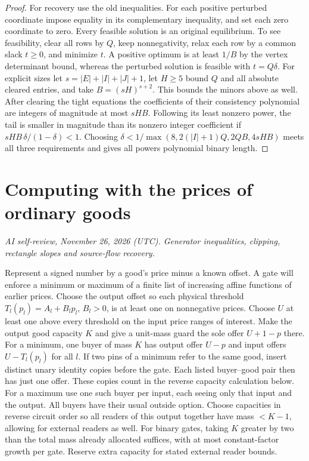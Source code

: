 \documentclass[11pt,oneside,openany,notitlepage]{report}
\newcommand{\reviewdate}{November 26, 2026 (UTC)}
\newcommand{\reviewmark}[1]{\par\nopagebreak[4]\noindent
  {\footnotesize\itshape AI self-review, \reviewdate. #1\par}\nobreak\smallskip}
\begin{document}
\begin{proof}
For recovery use the old inequalities. For each positive perturbed
coordinate impose equality in its complementary inequality, and set
each zero coordinate to zero. Every feasible solution is an original
equilibrium. To see feasibility, clear all rows by \(Q\), keep
nonnegativity, relax each row by a common slack \(t\ge0\), and minimize
\(t\). A positive optimum is at least \(1/B\) by the vertex determinant
bound, whereas the perturbed solution is feasible with \(t=Q\delta\).
For explicit sizes let \(s=|E|+|I|+|J|+1\), let \(H\ge5\) bound \(Q\)
and all absolute cleared entries, and take \(B=(sH)^{s+2}\). This bounds
the minors above as well. After clearing the tight equations the coefficients
of their consistency polynomial are integers of magnitude at most \(sHB\).
Following its least nonzero power, the tail is smaller in magnitude than
its nonzero integer coefficient if \(sHB\,\delta/(1-\delta)<1\).
Choosing \(\delta<1/\max(8,2(|I|+1)Q,2QB,4sHB)\) meets all three
requirements and gives all powers polynomial binary length.
\end{proof}

\section{Computing with the prices of ordinary goods}
\reviewmark{Generator inequalities, clipping, rectangle slopes and source-flow recovery.}

Represent a signed number by a good's price minus a known offset. A gate
will enforce a minimum or maximum of a finite list of increasing affine
functions of earlier prices. Choose the output offset so each physical
threshold \(T_l(p_l)=A_l+B_l p_l\), \(B_l>0\), is at least one on
nonnegative prices. Choose \(U\) at least one above every threshold on
the input price ranges of interest. Make the output good capacity \(K\)
and give a unit-mass guard the sole offer \(U+1-p\) there. For a minimum,
one buyer of mass \(K\) has output offer \(U-p\) and input offers
\(U-T_l(p_l)\) for all \(l\). If two pins of a minimum refer to the
same good, insert distinct unary identity copies before the gate. Each
listed buyer--good pair then has just one offer. These copies count in
the reverse capacity calculation below. For a maximum use one such buyer per input,
each seeing only that input and the output. All buyers have their usual
outside option. Choose capacities in reverse circuit order so all readers
of this output together have mass \(<K-1\), allowing for external
readers as well. For binary gates, taking \(K\) greater by two than the
total mass already allocated suffices, with at most constant-factor
growth per gate. Reserve extra capacity for stated external reader bounds.
\end{document}
